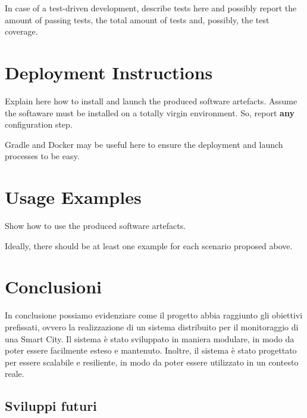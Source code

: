 \documentclass{scrartcl}
\begin{document}
In case of a test-driven development, describe tests here and possibly report the amount of passing tests, the total amount of tests and, possibly, the test coverage.

\section{Deployment Instructions}

Explain here how to install and launch the produced software artefacts.
%
Assume the softaware must be installed on a totally virgin environment.
%
So, report \textbf{any} configuration step.

Gradle and Docker may be useful here to ensure the deployment and launch processes to be easy.

\section{Usage Examples}

Show how to use the produced software artefacts.

Ideally, there should be at least one example for each scenario proposed above.

\section{Conclusioni}

In conclusione possiamo evidenziare come il progetto abbia raggiunto gli obiettivi prefissati, ovvero la realizzazione di un sistema distribuito per il monitoraggio di una Smart City. Il sistema è stato sviluppato in maniera modulare, in modo da poter essere facilmente esteso e mantenuto. Inoltre, il sistema è stato progettato per essere scalabile e resiliente, in modo da poter essere utilizzato in un contesto reale.

\subsection{Sviluppi futuri}
\end{document}
